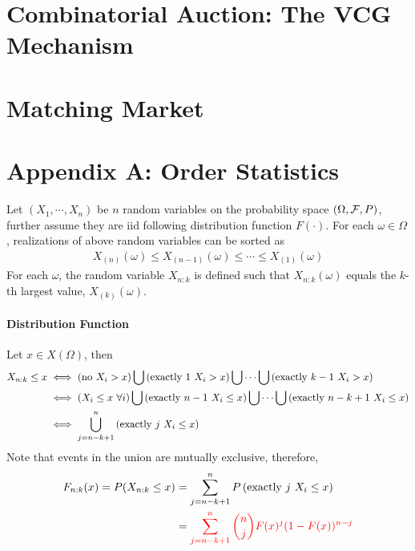 \documentclass{article}
\begin{document}
	\section{Combinatorial Auction: The VCG Mechanism}
	
	
	\section{Matching Market}

	\section{Appendix A: Order Statistics}
	\begin{definition}
		Let $(X_1, \cdots, X_n)$ be $n$ random variables on the probability space $(\Omega, \mathcal{{F}}, P)$, further assume they are iid following distribution function $F(\cdot)$. For each $\omega \in \Omega$, realizations of above random variables can be sorted as
		\begin{align}
			X_{(n)}(\omega) \leq X_{(n-1)}(\omega) \leq \cdots \leq X_{(1)}(\omega)
		\end{align}
		For each $\omega$, the random variable $X_{n:k}$ is defined such that $X_{n:k}(\omega)$ equals the $k$-th largest value, $X_{(k)}(\omega)$.
	\end{definition}
	
	\paragraph{Distribution Function} Let $x \in X(\Omega)$, then 
	\begin{align}
		X_{n:k} \leq x
		&\iff (\text{{no $X_i > x$}}) \bigcup \left(\text{{exactly $1$ $X_i > x$}}\right) \bigcup  \cdots \bigcup \left(\text{{exactly $k-1$ $X_i > x$}}\right) \\
		&\iff (X_i \leq x\ \forall i) \bigcup \left(\text{{exactly $n-1$ $X_i \leq x$}}\right) \bigcup  \cdots \bigcup \left(\text{{exactly $n-k+1$ $X_i \leq x$}}\right) \\
		&\iff \bigcup_{j=n-k+1}^n \left(\text{{exactly $j$ $X_i \leq x$}}\right)
	\end{align}
	Note that events in the union are mutually exclusive, therefore,
	\begin{align}
		F_{n:k}(x) = P(X_{n:k} \leq x)
		&= \sum_{j=n-k+1}^n P\left(\text{{exactly $j$ $X_i \leq x$}}\right) \\
		&= \textcolor{red}{\sum_{j=n-k+1}^n \binom{n}{j} F(x)^j (1 - F(x))^{n-j}}
	\end{align}
\end{document}
